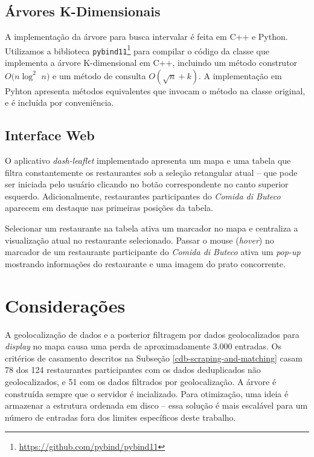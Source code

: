 \documentclass[10pt,a4paper]{article}
\begin{document}
\subsection{Árvores K-Dimensionais}
\label{kd-trees-impl}
A implementação da árvore para busca intervalar é feita em C++ e Python. Utilizamos a biblioteca \texttt{pybind11}\footnote{\url{https://github.com/pybind/pybind11}} para compilar o código da classe que implementa a árvore K-dimensional em C++, incluindo um método construtor $O(n \log^2$ $ n)$ e um método de consulta $O(\sqrt{n} + k)$. A implementação em Pyhton apresenta métodos equivalentes que invocam o método na classe original, e é incluída por conveniência.

\subsection{Interface Web}
\label{web}
O aplicativo \textit{dash-leaflet} implementado apresenta um mapa e uma tabela que filtra constantemente os restaurantes sob a seleção retangular atual -- que pode ser iniciada pelo usuário clicando no botão correspondente no canto superior esquerdo. Adicionalmente, restaurantes participantes do \textit{Comida di Buteco} aparecem em destaque nas primeiras posições da tabela.

Selecionar um restaurante na tabela ativa um marcador no mapa e centraliza a visualização atual no restaurante selecionado. Passar o mouse (\textit{hover}) no marcador de um restaurante participante do \textit{Comida di Buteco} ativa um \textit{pop-up} mostrando informações do restaurante e uma imagem do prato concorrente.

\section{Considerações}
\label{considerations}
\begin{outline}[enumerate]
        \1 A geolocalização de dados e a posterior filtragem por dados geolocalizados para \textit{display} no mapa causa uma perda de aproximadamente 3.000 entradas.
        \1 Os critérios de casamento descritos na Subseção \ref{cdb-scraping-and-matching} casam 78 dos 124 restaurantes participantes com os dados deduplicados não geolocalizados, e 51 com os dados filtrados por geolocalização.
        \1 A árvore é construída sempre que o servidor é incializado. Para otimização, uma ideia é armazenar a estrutura ordenada em disco -- essa solução é mais escalável para um número de entradas fora dos limites específicos deste trabalho.
\end{outline}
\end{document}
